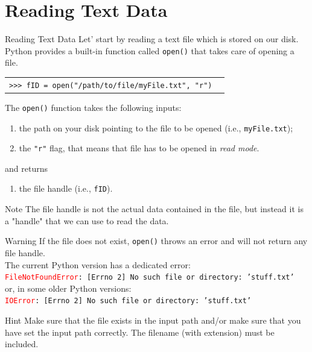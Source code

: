 \documentclass[t,handout,9pt]{beamer}
\begin{document}
\section{Reading Text Data}
\begin{frame}{Reading Text Data}
\vfill
Let' start by reading a text file which is stored on our disk.
\vfill
Python provides a built-in function called \texttt{open()} that takes care of opening a file.
\begin{table}[]
\begin{flushleft}
\begin{tabular}{ll}
\texttt{>{}>{}> fID = open("/path/to/file/myFile.txt", "r")} &  \\
\end{tabular}
\end{flushleft}
\end{table}
The \texttt{open()} function takes the following inputs:
\begin{enumerate}
	\item the path on your disk pointing to the file to be opened (i.e., \texttt{myFile.txt});
	\item the \texttt{"r"} flag, that means that file has to be opened in \textit{read mode}.
\end{enumerate}
and returns
\begin{enumerate}
	\item the file handle (i.e., \texttt{fID}).
\end{enumerate}
\vfill
\begin{block}{Note}
The file handle is not the actual data contained in the file, but instead it is a "handle" that we can use to read the data.
\end{block}
\vfill
\end{frame}
%
\begin{frame}
\vfill
\begin{block}{Warning}
If the file does not exist, \texttt{open()} throws an error and will not return any file handle.\\The current Python version has a dedicated error:\\
\texttt{\textcolor{red}{FileNotFoundError}: [Errno 2] No such file or directory: 'stuff.txt'}\\
or, in some older Python versions:\\
\texttt{\textcolor{red}{IOError}: [Errno 2] No such file or directory: 'stuff.txt'}\\
\end{block}
\vfill
\begin{block}{Hint}
Make sure that the file exists in the input path and/or make sure that you have set the input path correctly. The filename (with extension) must be included.
\end{block}
\vfill
\end{frame}
%
\end{document}
